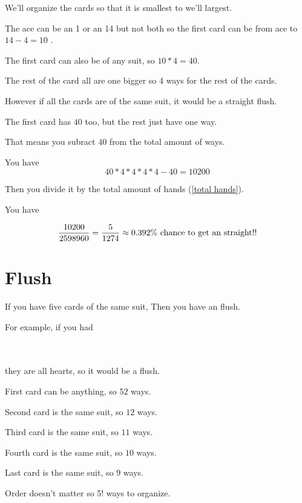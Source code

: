 \documentclass[12pt]{article}
\newcommand\redcard[2]{%
  \begingroup\fboxsep=0pt\relax
  \fbox{\color{red}\tabbedCenterstack{%
  \scriptsize$#2$ && \\&\makebox[10pt]{#1}&\\&&\rotatebox[origin=c]{180}{\scriptsize$#2$}}}%
  \endgroup}
\begin{document}
We'll organize the cards so that it is smallest to we'll largest.

The ace can be an 1 or an 14 but not both so the first card can be from ace to $ 14 - 4 = 10$ .

The first card can also be of any suit, so $ 10 * 4 = 40 $.

The rest of the card all are one bigger so 4 ways for the rest of the cards.

However if all the cards are of the same suit, it would be a straight flush.

The first card has $ 40 $ too, but the rest just have one way.

That means you subract $  40 $ from the total amount of ways.

You have
\begin{equation}
  40 * 4 * 4 * 4 * 4 - 40 = 10200
\end{equation}

Then you divide it by the total amount of hands (\ref{total hands}).

You have

\begin{equation}
  {10200 \over 2598960} = {5 \over 1274} \approx 0.392\% \hbox{ chance to get an straight!!}
\end{equation}

\section{Flush}

If you have five cards of the same suit, Then you have an flush.

For example, if you had

\redcard{5}{\heartsuit}
\redcard{7}{\heartsuit}
\redcard{9}{\heartsuit}
\redcard{J}{\heartsuit}
\redcard{A}{\heartsuit}
\\\\

they are all hearts, so it would be a flush.

First card can be anything, so $52$ ways.

Second card is the same suit, so $12$ ways.

Third card is the same suit, so $11$ ways.

Fourth card is the same suit, so $10$ ways.

Last card is the same suit, so $9$ ways.

Order doesn't matter so 5! ways to organize.
\end{document}
